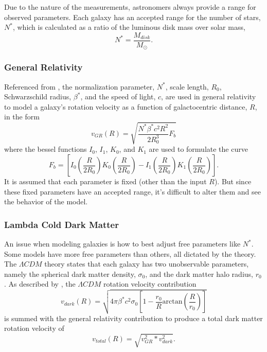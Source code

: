 \documentclass[conference]{IEEEtran}
\begin{document}
Due to the nature of the measurements, astronomers always provide a range for observed parameters. Each galaxy has an accepted range for the number of stars, $N^*$, which is calculated as a ratio of the luminous disk mass over solar mass,
\begin{equation}
N^* = \frac{M_{disk}}{M_{\odot}}.
\end{equation}

\subsubsection{General Relativity}

Referenced from \cite{mannheim}, the normalization parameter, $N^*$, scale length, $R_0$, Schwarzschild radius, $\beta^*$, and the speed of light, $c$, are used in general relativity to model a galaxy's rotation velocity as a function of galactocentric distance, $R$, in the form
\begin{equation}
v_{GR}(R) = \sqrt{\frac{N^*\beta^*c^2R^2}{2R^3_0}F_b}
\end{equation}
where the bessel functions $I_0$, $I_1$, $K_0$, and $K_1$ are used to formulate the curve
\begin{equation}
F_b = \left[I_0\left(\frac{R}{2R_0}\right)K_0\left(\frac{R}{2R_0}\right)-I_1\left(\frac{R}{2R_0}\right)K_1\left(\frac{R}{2R_0}\right)\right].
\end{equation}
It is assumed that each parameter is fixed (other than the input $R$). But since these fixed parameters have an accepted range, it's difficult to alter them and see the behavior of the model. 


\subsubsection{Lambda Cold Dark Matter}
An issue when modeling galaxies is how to best adjust free parameters like $N^*$. Some models have more free parameters than others, all dictated by the theory. The $\Lambda CDM$ theory states that each galaxy has two unobservable parameters, namely the spherical dark matter density, $\sigma_0$, and the dark matter halo radius, $r_0$. As described by \cite{mannheim}, the $\Lambda CDM$ rotation velocity contribution
\begin{equation}
v_{dark}(R) = \sqrt{4\pi\beta^*c^2\sigma_0\left[1-\frac{r_0}{R}\text{arctan}\left(\frac{R}{r_0}\right)\right]}
\end{equation}
is summed with the general relativity contribution to produce a total dark matter rotation velocity of 
\begin{equation}
v_{total}(R) = \sqrt{v_{GR}^2 * v_{dark}^2}.
\end{equation}
\end{document}
